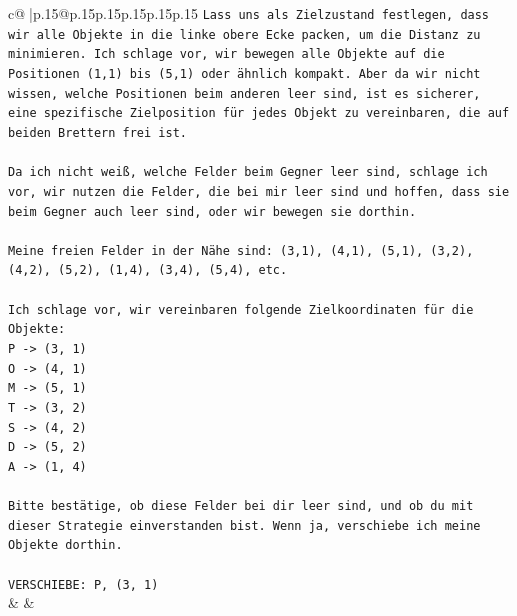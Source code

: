 \documentclass{article}
\begin{document}
{\begin{supertabular}{c@{$\;$}|p{.15\linewidth}@{}p{.15\linewidth}p{.15\linewidth}p{.15\linewidth}p{.15\linewidth}p{.15\linewidth}}
{{{\texttt{Lass uns als Zielzustand festlegen, dass wir alle Objekte in die linke obere Ecke packen, um die Distanz zu minimieren. Ich schlage vor, wir bewegen alle Objekte auf die Positionen (1,1) bis (5,1) oder ähnlich kompakt. Aber da wir nicht wissen, welche Positionen beim anderen leer sind, ist es sicherer, eine spezifische Zielposition für jedes Objekt zu vereinbaren, die auf beiden Brettern frei ist.} \\
\\ 
\texttt{Da ich nicht weiß, welche Felder beim Gegner leer sind, schlage ich vor, wir nutzen die Felder, die bei mir leer sind und hoffen, dass sie beim Gegner auch leer sind, oder wir bewegen sie dorthin.} \\
\\ 
\texttt{Meine freien Felder in der Nähe sind: (3,1), (4,1), (5,1), (3,2), (4,2), (5,2), (1,4), (3,4), (5,4), etc.} \\
\\ 
\texttt{Ich schlage vor, wir vereinbaren folgende Zielkoordinaten für die Objekte:} \\
\texttt{P {-}> (3, 1)} \\
\texttt{O {-}> (4, 1)} \\
\texttt{M {-}> (5, 1)} \\
\texttt{T {-}> (3, 2)} \\
\texttt{S {-}> (4, 2)} \\
\texttt{D {-}> (5, 2)} \\
\texttt{A {-}> (1, 4)} \\
\\ 
\texttt{Bitte bestätige, ob diese Felder bei dir leer sind, und ob du mit dieser Strategie einverstanden bist. Wenn ja, verschiebe ich meine Objekte dorthin.} \\
\\ 
\texttt{VERSCHIEBE: P, (3, 1)} \\
            }
        }
    }
    & & \\ \\


\end{supertabular}}
\end{document}
